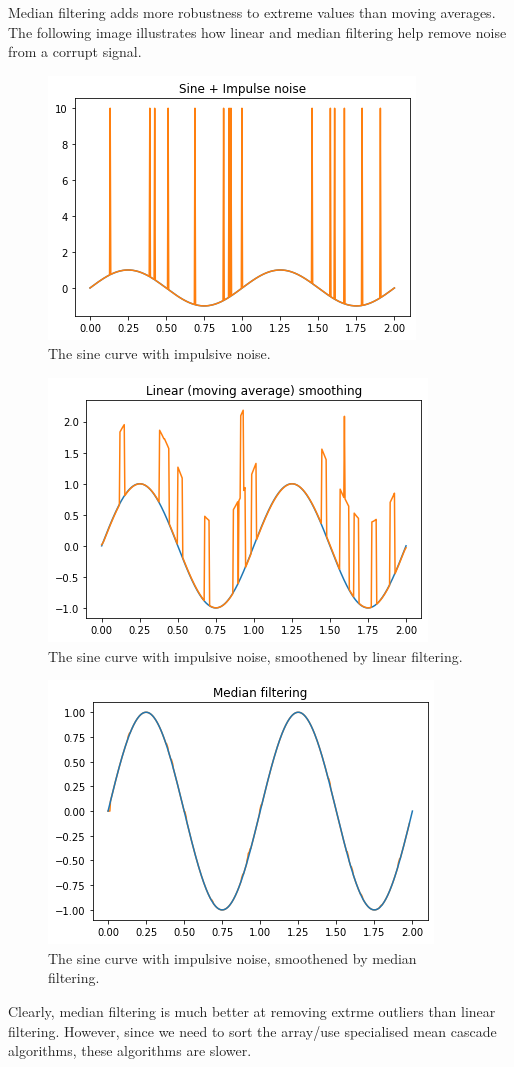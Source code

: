 \documentclass[a4paper, openany]{memoir}
\begin{document}
Median filtering adds more robustness to extreme values than moving averages. The following image illustrates how linear and median filtering help remove noise from a corrupt signal.
\begin{figure}[H]
    \centering
    \includegraphics[scale=0.6]{src/6.8 sine with noise.png}
    \caption{The sine curve with impulsive noise.}
\end{figure}
\begin{figure}[H]
    \centering
    \includegraphics[scale=0.6]{src/6.9 sine with noise (linear).png}
    \caption{The sine curve with impulsive noise, smoothened by linear filtering.}
\end{figure}
\begin{figure}[H]
    \centering
    \includegraphics[scale=0.6]{src/6.10 sine with noise (median).png}
    \caption{The sine curve with impulsive noise, smoothened by median filtering.}
\end{figure}
\noindent Clearly, median filtering is much better at removing extrme outliers than linear filtering. However, since we need to sort the array/use specialised mean cascade algorithms, these algorithms are slower.
\end{document}
